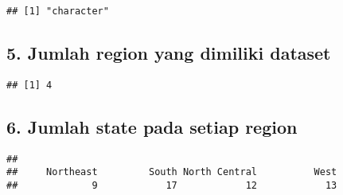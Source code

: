 \documentclass[
]{article}
\newenvironment{Shaded}{\begin{snugshade}}{\end{snugshade}}
\newcommand{\FunctionTok}[1]{\textcolor[rgb]{0.00,0.00,0.00}{#1}}
\newcommand{\NormalTok}[1]{#1}
\newcommand{\OtherTok}[1]{\textcolor[rgb]{0.56,0.35,0.01}{#1}}
\newcommand{\SpecialCharTok}[1]{\textcolor[rgb]{0.00,0.00,0.00}{#1}}
\begin{document}
\begin{Shaded}
\end{Shaded}

\begin{verbatim}
## [1] "character"
\end{verbatim}

\hypertarget{jumlah-region-yang-dimiliki-dataset}{%
\subsection{5. Jumlah region yang dimiliki
dataset}\label{jumlah-region-yang-dimiliki-dataset}}

\begin{Shaded}
\end{Shaded}

\begin{verbatim}
## [1] 4
\end{verbatim}

\hypertarget{jumlah-state-pada-setiap-region}{%
\subsection{6. Jumlah state pada setiap
region}\label{jumlah-state-pada-setiap-region}}

\begin{Shaded}
\end{Shaded}

\begin{verbatim}
## 
##     Northeast         South North Central          West 
##             9            17            12            13
\end{verbatim}
\end{document}
